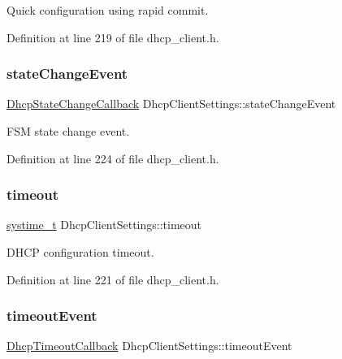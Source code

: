 Quick configuration using rapid commit. 



Definition at line 219 of file dhcp\+\_\+client.\+h.

\mbox{\label{structDhcpClientSettings_a3451c1403597e35592da1957bbd803d9}} 
\subsubsection{\texorpdfstring{state\+Change\+Event}{stateChangeEvent}}
{\footnotesize\ttfamily \hyperlink{dhcp__client_8h_a89e859af4d5fbfc33096ffc3592cf935}{Dhcp\+State\+Change\+Callback} Dhcp\+Client\+Settings\+::state\+Change\+Event}



F\+SM state change event. 



Definition at line 224 of file dhcp\+\_\+client.\+h.

\mbox{\label{structDhcpClientSettings_a495c8cbe9aea2df4028d4fb89bce982e}} 
\subsubsection{\texorpdfstring{timeout}{timeout}}
{\footnotesize\ttfamily \hyperlink{compiler__port_8h_ae3e32a98d431a02106616da3071832dd}{systime\+\_\+t} Dhcp\+Client\+Settings\+::timeout}



D\+H\+CP configuration timeout. 



Definition at line 221 of file dhcp\+\_\+client.\+h.

\mbox{\label{structDhcpClientSettings_ab680b600ec887dfb4369b3f2fa4f9538}} 
\subsubsection{\texorpdfstring{timeout\+Event}{timeoutEvent}}
{\footnotesize\ttfamily \hyperlink{dhcp__client_8h_a14e8927cda032ddc5ec3993d38d46109}{Dhcp\+Timeout\+Callback} Dhcp\+Client\+Settings\+::timeout\+Event}




